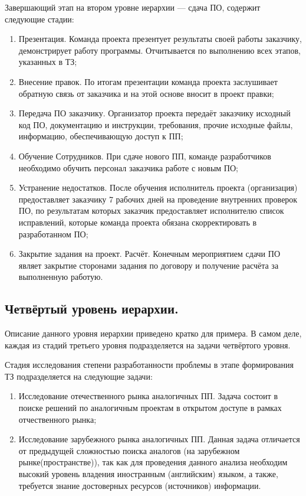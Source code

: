 Завершающий этап на втором уровне иерархии --- сдача ПО, содержит следующие стадии:
\begin{enumerate}
	\item Презентация. Команда проекта презентует результаты своей работы заказчику, демонстрирует работу программы. Отчитывается по выполнению всех этапов, указанных в ТЗ;
	\item Внесение правок. По итогам презентации команда проекта заслушивает обратную связь от заказчика и на этой основе вносит в проект правки;
	\item Передача ПО заказчику. Организатор проекта передаёт заказчику исходный код ПО, документацию и инструкции, требования, прочие исходные файлы, информацию, обеспечивающую доступ к ПП;
	\item Обучение Сотрудников. При сдаче нового ПП, команде разработчиков необходимо обучить персонал заказчика работе с новым ПО;
	\item Устранение недостатков. После обучения исполнитель проекта (организация) предоставляет заказчику 7 рабочих дней на проведение внутренних проверок ПО, по результатам которых заказчик предоставляет исполнителю список исправлений, которые команда проекта обязана скорректировать в разработанном ПО;
	\item Закрытие задания на проект. Расчёт. Конечным мероприятием сдачи ПО являет закрытие сторонами задания по договору и получение расчёта за выполненную работую.
\end{enumerate}

\subsection{Четвёртый уровень иерархии.}

Описание данного уровня иерархии приведено кратко для примера. В самом деле, каждая из стадий третьего уровня подразделяется на задачи четвёртого уровня.

Стадия исследования степени разработанности проблемы в этапе формирования ТЗ подразделяется на следующие задачи:
\begin{enumerate}
	\item Исследование отечественного рынка аналогичных ПП. Задача состоит в поиске решений по аналогичным проектам в открытом доступе в рамках отчественного рынка;
	\item Исследование зарубежного рынка аналогичных ПП. Данная задача отличается от предыдущей сложностью поиска аналогов (на зарубежном рынке(пространстве)), так как для проведения данного анализа необходим высокий уровень владения иностранным (английским) языком, а также, требуется знание достоверных ресурсов (источников) информации.
\end{enumerate}

